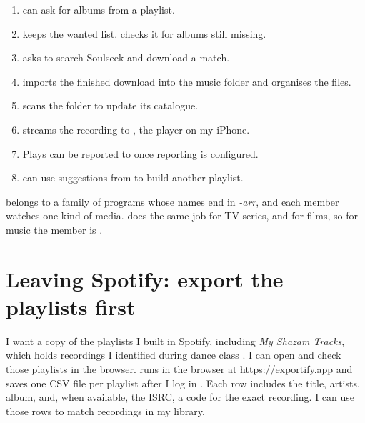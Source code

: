 \documentclass[11pt,a4paper]{article}
\begin{document}
\begin{enumerate}[nosep]
  \item {} can ask  for albums from a playlist.
  \item {} keeps the wanted list.  checks it for albums still missing.
  \item {} asks  to search Soulseek and download a match.
  \item {} imports the finished download into the music folder and organises the files.
  \item {} scans the folder to update its catalogue.
  \item {} streams the recording to , the player on my iPhone.
  \item Plays can be reported to  once reporting is configured.
  \item {} can use suggestions from  to build another playlist.
\end{enumerate}

 belongs to a family of programs whose names end in \emph{-arr}, and each member watches one kind of media.  does the same job for TV series, and  for films, so for music the member is .

\section{Leaving Spotify: export the playlists first}

I want a copy of the playlists I built in Spotify, including \emph{My Shazam Tracks}, which holds recordings I identified during dance class \cite{shazam}. I can open and check those playlists in the browser.  runs in the browser at \url{https://exportify.app} and saves one CSV file per playlist after I log in \cite{exportify}. Each row includes the title, artists, album, and, when available, the ISRC, a code for the exact recording. I can use those rows to match recordings in my library.
\end{document}
